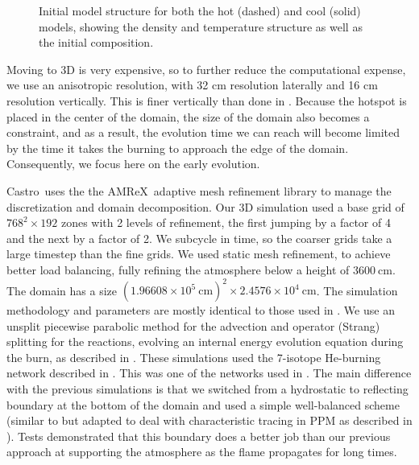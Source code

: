 \documentclass[linenumbers,trackchanges]{aastex631}
\newcommand{\castro}{{\sf Castro}}
\newcommand{\amrex}{{\sf AMReX}}
\begin{document}
\begin{figure}[t]
\centering
{}
\caption{\label{fig:initial model} Initial model structure for both
the hot (dashed) and cool (solid) models, showing the density
and temperature structure as well as the initial composition.}
\end{figure}

Moving to 3D is very expensive, so to further reduce the computational
expense, we use an anisotropic resolution, with 32 cm resolution
laterally and 16 cm resolution vertically.  This is finer vertically
than done in \citet{harpole:2021}.  Because the hotspot is placed in
the center of the domain, the size of the domain also becomes a
constraint, and as a result, the evolution time we can reach will
become limited by the time it takes the burning to approach the edge
of the domain.  Consequently, we focus here on the early evolution.

\castro\ uses the the \amrex\ adaptive mesh refinement library
\citep{amrex_joss} to manage the discretization and domain
decomposition.  Our 3D simulation used a base grid of $768^2 \times
192$ zones with 2 levels of refinement, the first jumping by a factor
of 4 and the next by a factor of 2.  We subcycle in time, so the
coarser grids take a large timestep than the fine grids.  We used
static mesh refinement, to achieve better load balancing, fully
refining the atmosphere below a height of $3600~\mathrm{cm}$.  The
domain has a size $(1.96608\times 10^5~\mathrm{cm})^2 \times
2.4576\times 10^4~\mathrm{cm}$.  The simulation methodology and
parameters are mostly identical to those used in \citet{harpole:2021}.
We use an unsplit piecewise parabolic method
\citep{ppmunsplit,millercolella:2002} for the advection and operator
(Strang) splitting for the reactions, evolving an internal energy
evolution equation during the burn, as described in
\citet{strang_rnaas}.  These simulations used the 7-isotope He-burning
network described in \citet{iso7}.  This was one of the networks used
in \citet{eiden:2020}.    The main difference with the previous
simulations is that we switched from a hydrostatic to reflecting
boundary at the bottom of the domain and used a simple well-balanced
scheme (similar to \citealt{kappeli:2016} but adapted to deal with
characteristic tracing in PPM as described in \citealt{ppm-hse}).
Tests demonstrated that this boundary does a better job than our
previous approach at supporting the atmosphere as the flame propagates
for long times.
\end{document}

